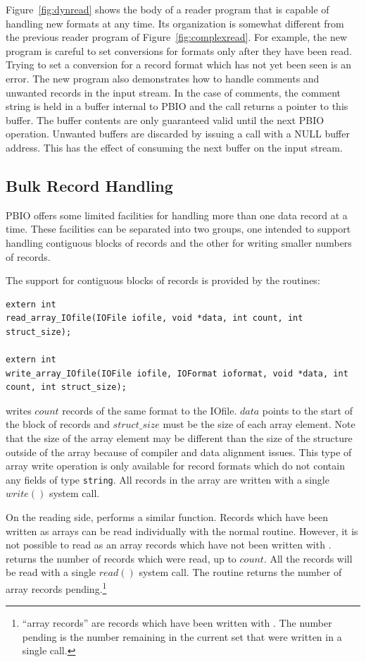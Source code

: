 Figure~\ref{fig:dynread} shows the body of a reader program that is capable of
handling new formats at any time.  Its organization is somewhat different from
the previous reader program of Figure~\ref{fig:complexread}.  For example, the
new program is careful to set conversions for formats only after they have
been read.  Trying to set a conversion for a record format which has not yet
been seen is an error.  The new program also demonstrates how to handle
comments and unwanted records in the input stream.  In the case of comments,
the comment string is held in a buffer internal to PBIO and the
 call returns a pointer to this buffer.  The buffer
contents are only guaranteed valid until the next PBIO operation.  Unwanted
buffers are discarded by issuing a  call with a NULL buffer
address.  This has the effect of consuming the next buffer on the input
stream.  

\subsection{Bulk Record Handling}

PBIO offers some limited facilities for handling more than one data record at
a time.  These facilities can be separated into two groups, one intended to
support handling contiguous blocks of records and the other for writing smaller
numbers of records.

The support for contiguous blocks of records is provided by the routines:
\begin{verbatim}
extern int
read_array_IOfile(IOFile iofile, void *data, int count, int struct_size);

extern int
write_array_IOfile(IOFile iofile, IOFormat ioformat, void *data, int count, int struct_size);
\end{verbatim}
 writes $count$ records of the same format to the
IOfile.  $data$ points to the start of the block of records and $struct\_size$
must be the size of each array element.  Note that the size of the array
element may be different than the size of the structure outside of the array
because of compiler and data alignment issues.  This type of array write
operation is only available for record formats which do not contain any fields
of type {\tt string}.  All records in the array are written with a single
$write()$ system call.

On the reading side,  performs a similar function.
Records which have been written as arrays can be read individually with the
normal  routine.  However, it is not possible to read as an
array records which have not been written with .
 returns the number of records which were read, up to
$count$.  All the records will be read with a single $read()$ system call.
The routine  returns the number of array
records pending.\footnote{``array records'' are records which have been
written with .  The number pending is the number
remaining in the current set that were written in a single call.}

